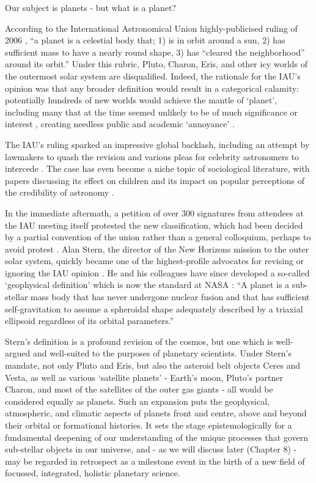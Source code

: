 \documentclass[a4paper,11pt,oneside]{book}
\begin{document}
Our subject is planets - but what is a planet?

According to the International Astronomical Union highly-publicised ruling of 2006 \cite{International_Astronomical_Union2006-ft}, ``a planet is a celestial body that; 1) is in orbit around a sun, 2) has sufficient mass to have a nearly round shape, 3) has ``cleared the neighborhood'' around its orbit.'' Under this rubric, Pluto, Charon, Eris, and other icy worlds of the outermost solar system are disqualified. Indeed, the rationale for the IAU's opinion was that any broader definition would result in a categorical calamity: potentially hundreds of new worlds would achieve the mantle of `planet', including many that at the time seemed unlikely to be of much significance or interest \cite{Sarma2008-wu}, creating needless public and academic `annoyance' \cite{Basri2006-vw}.

The IAU's ruling sparked an impressive global backlash, including an attempt by lawmakers to quash the revision \cite{Zielinski2007-fv} and various pleas for celebrity astronomers to intercede \cite{Tyson2009-oe}. The case has even become a niche topic of sociological literature, with papers discussing its effect on children \citet{Jarman2009-ms, Broughton2013-wz} and its impact on popular perceptions of the credibility of astronomy \citet{Christensen2007-xw, Messeri2010-wo}.

In the immediate aftermath, a petition of over 300 signatures from attendees at the IAU meeting itself protested the new classification, which had been decided by a partial convention of the union rather than a general colloquium, perhaps to avoid protest \cite{Cartlidge2006-oe}. Alan Stern, the director of the New Horizons mission to the outer solar system, quickly became one of the highest-profile advocates for revising or ignoring the IAU opinion \cite{Hogan2006-aw}. He and his colleagues have since developed a so-called `geophysical definition' which is now the standard at NASA \cite{Runyon2017-rz}: ``A planet is a sub-stellar mass body that has never undergone nuclear fusion and that has sufficient self-gravitation to assume a spheroidal shape adequately described by a triaxial ellipsoid regardless of its orbital parameters.''

Stern's definition is a profound revision of the cosmos, but one which is well-argued and well-suited to the purposes of planetary scientists. Under Stern's mandate, not only Pluto and Eris, but also the asteroid belt objects Ceres and Vesta, as well as various `satellite planets' - Earth's moon, Pluto's partner Charon, and most of the satellites of the outer gas giants - all would be considered equally as planets. Such an expansion puts the geophysical, atmospheric, and climatic aspects of planets front and centre, above and beyond their orbital or formational histories. It sets the stage epistemologically for a fundamental deepening of our understanding of the unique processes that govern sub-stellar objects in our universe, and - as we will discuss later (Chapter 8) - may be regarded in retrospect as a milestone event in the birth of a new field of focussed, integrated, holistic planetary science.
\end{document}
